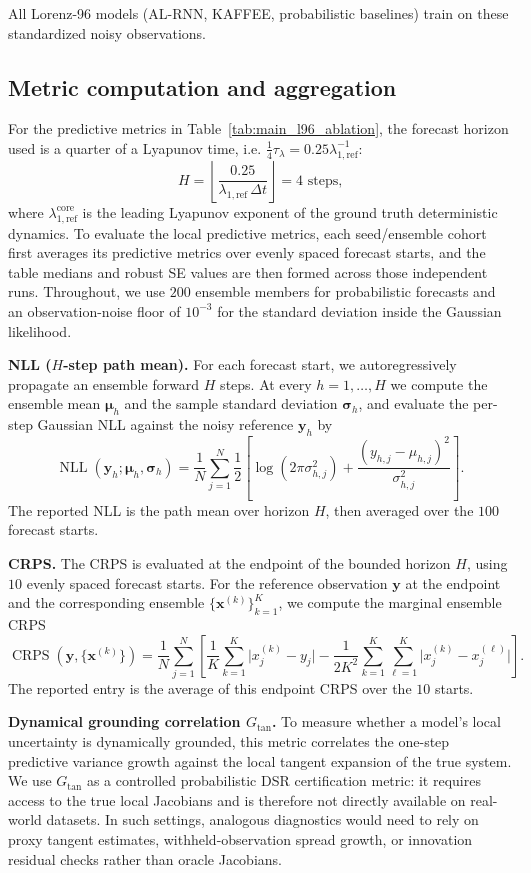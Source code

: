 \documentclass{article}
\theoremstyle{plain}
\theoremstyle{definition}
\theoremstyle{remark}
\begin{document}
All Lorenz-96 models (AL-RNN, KAFFEE, probabilistic baselines) train on these standardized noisy observations.

\subsection{Metric computation and aggregation}
\label{app:metric_computation}
For the predictive metrics in Table~\ref{tab:main_l96_ablation}, the forecast horizon used is a quarter of a Lyapunov time, i.e. $\tfrac14\tau_{\lambda} = 0.25\lambda_{1,\mathrm{ref}}^{-1}$:
\[
H
=
\left\lfloor
\frac{0.25}{\lambda_{1,\mathrm{ref}}\,\Delta t}
\right\rfloor
= 4
\text{ steps,}
\]
where $\lambda_{1,\mathrm{ref}}^\mathrm{core}$ is the leading Lyapunov exponent of the ground truth deterministic dynamics. To evaluate the local predictive metrics, each seed/ensemble cohort first averages its predictive metrics over evenly spaced forecast starts, and the table medians and robust SE values are then formed across those independent runs. Throughout, we use $200$ ensemble members for probabilistic forecasts and an observation-noise floor of $10^{-3}$ for the standard deviation inside the Gaussian likelihood.

\textbf{NLL ($H$-step path mean).}
For each forecast start, we autoregressively propagate an ensemble forward $H$ steps. At every $h=1,\dots,H$ we compute the ensemble mean $\bm\mu_h$ and the sample standard deviation $\bm\sigma_h$, and evaluate the per-step Gaussian NLL against the noisy reference $\bm y_h$ by
\[
\operatorname{NLL}(\bm y_h;\bm\mu_h,\bm\sigma_h)
=
\frac{1}{N}
\sum_{j=1}^{N}
\frac12\left[
\log(2\pi\sigma_{h,j}^2)
+
\frac{(y_{h,j}-\mu_{h,j})^2}{\sigma_{h,j}^2}
\right].
\]
The reported NLL is the path mean over horizon $H$, then averaged over the $100$ forecast starts.

\textbf{CRPS.}
The CRPS is evaluated at the endpoint of the bounded horizon $H$, using $10$ evenly spaced forecast starts. For the reference observation $\bm y$ at the endpoint and the corresponding ensemble $\{\bm x^{(k)}\}_{k=1}^{K}$, we compute the marginal ensemble CRPS
\[
\operatorname{CRPS}(\bm y,\{\bm x^{(k)}\})
=
\frac{1}{N}
\sum_{j=1}^{N}
\left[
\frac{1}{K}\sum_{k=1}^{K}\lvert x_j^{(k)}-y_j\rvert
-
\frac{1}{2K^2}\sum_{k=1}^{K}\sum_{\ell=1}^{K}\lvert x_j^{(k)}-x_j^{(\ell)}\rvert
\right].
\]
The reported entry is the average of this endpoint CRPS over the $10$ starts.


\textbf{Dynamical grounding correlation $G_{\mathrm{tan}}$.}
To measure whether a model's local uncertainty is dynamically grounded, this metric correlates the one-step predictive variance growth against the local tangent expansion of the true system. We use $G_{\mathrm{tan}}$ as a controlled probabilistic DSR certification metric: it requires access to the true local Jacobians and is therefore not directly available on real-world datasets. In such settings, analogous diagnostics would need to rely on proxy tangent estimates, withheld-observation spread growth, or innovation residual checks rather than oracle Jacobians.
\end{document}
